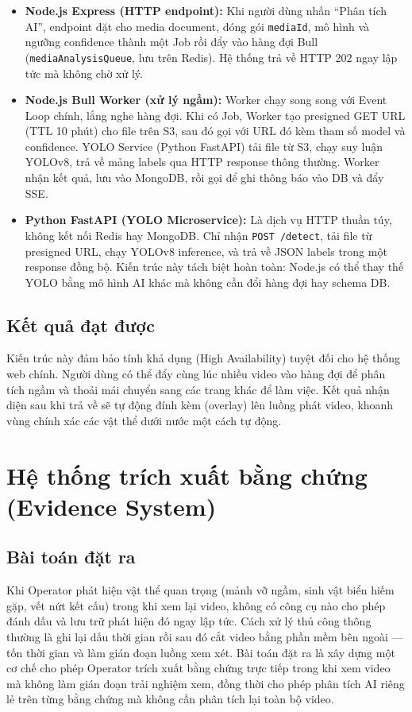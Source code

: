 \documentclass[../DoAn.tex]{subfiles}
\begin{document}
\begin{itemize}
    \item \textbf{Node.js Express (HTTP endpoint):} Khi người dùng nhấn ``Phân tích AI'', endpoint  đặt  cho media document, đóng gói \texttt{mediaId}, mô hình và ngưỡng confidence thành một Job rồi đẩy vào hàng đợi Bull (\texttt{mediaAnalysisQueue}, lưu trên Redis). Hệ thống trả về HTTP 202 ngay lập tức mà không chờ xử lý.

    \item \textbf{Node.js Bull Worker (xử lý ngầm):} Worker chạy song song với Event Loop chính, lắng nghe hàng đợi. Khi có Job, Worker tạo presigned GET URL (TTL 10 phút) cho file trên S3, sau đó gọi  với URL đó kèm tham số model và confidence. YOLO Service (Python FastAPI) tải file từ S3, chạy suy luận YOLOv8, trả về mảng labels qua HTTP response thông thường. Worker nhận kết quả, lưu  vào MongoDB, rồi gọi  để ghi thông báo vào DB và đẩy SSE.

    \item \textbf{Python FastAPI (YOLO Microservice):} Là dịch vụ HTTP thuần túy, không kết nối Redis hay MongoDB. Chỉ nhận \texttt{POST /detect}, tải file từ presigned URL, chạy YOLOv8 inference, và trả về JSON labels trong một response đồng bộ. Kiến trúc này tách biệt hoàn toàn: Node.js có thể thay thế YOLO bằng mô hình AI khác mà không cần đổi hàng đợi hay schema DB.
\end{itemize}

\subsection{Kết quả đạt được}
Kiến trúc này đảm bảo tính khả dụng (High Availability) tuyệt đối cho hệ thống web chính. Người dùng có thể đẩy cùng lúc nhiều video vào hàng đợi để phân tích ngầm và thoải mái chuyển sang các trang khác để làm việc. Kết quả nhận diện sau khi trả về sẽ tự động đính kèm (overlay) lên luồng phát video, khoanh vùng chính xác các vật thể dưới nước một cách tự động.

\section{Hệ thống trích xuất bằng chứng (Evidence System)}
\label{section:5.3}
\subsection{Bài toán đặt ra}
Khi Operator phát hiện vật thể quan trọng (mảnh vỡ ngầm, sinh vật biển hiếm gặp, vết nứt kết cấu) trong khi xem lại video, không có công cụ nào cho phép đánh dấu và lưu trữ phát hiện đó ngay lập tức. Cách xử lý thủ công thông thường là ghi lại dấu thời gian rồi sau đó cắt video bằng phần mềm bên ngoài — tốn thời gian và làm gián đoạn luồng xem xét. Bài toán đặt ra là xây dựng một cơ chế cho phép Operator trích xuất bằng chứng trực tiếp trong khi xem video mà không làm gián đoạn trải nghiệm xem, đồng thời cho phép phân tích AI riêng lẻ trên từng bằng chứng mà không cần phân tích lại toàn bộ video.
\end{document}
